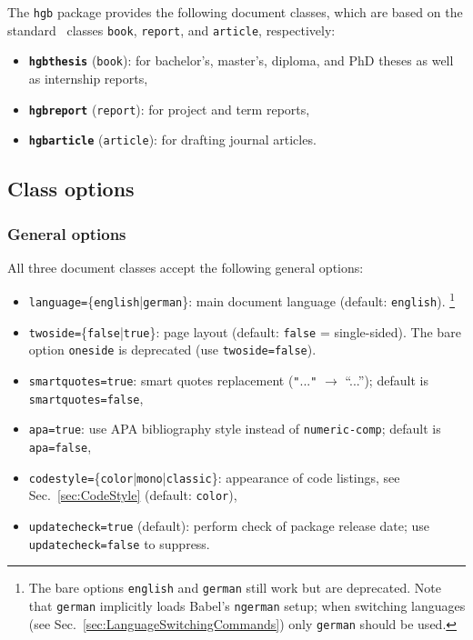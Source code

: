 \documentclass[language=english]{hgbarticle}
\begin{document}
The \texttt{hgb} package provides the following document classes, which are
based on the standard \latex\ classes \texttt{book}, \texttt{report}, and
\texttt{article}, respectively:
%
\begin{itemize}
    \item \textbf{\texttt{hgbthesis}} (\texttt{book}):
    for bachelor's, master's, diploma, and PhD theses as well as internship reports,
    \item \textbf{\texttt{hgbreport}} (\texttt{report}):
    for project and term reports,
    \item \textbf{\texttt{hgbarticle}} (\texttt{article}):
    for drafting journal articles.
\end{itemize}


\subsection{Class options}

\subsubsection{General options}

All three document classes accept the following general options:
%
\begin{itemize}
	\item \texttt{language=}\{\texttt{english}|\texttt{german}\}:
		main document language (default: \texttt{english}).%
		\footnote{The bare options \texttt{english} and \texttt{german} still work but are deprecated.
		Note that \texttt{german} implicitly loads Babel's \texttt{ngerman} setup; when switching languages
		(see Sec.~\ref{sec:LanguageSwitchingCommands}) only \texttt{german} should be used.}
	\item \texttt{twoside=}\{\texttt{false}|\texttt{true}\}:
		page layout (default: \texttt{false} = single-sided).
		The bare option \texttt{oneside} is deprecated (use \texttt{twoside=false}).
	\item \texttt{smartquotes=true}:
		smart quotes replacement (\verb!"!...\verb!"! $\rightarrow$ ``...'');
		default is \texttt{smartquotes=false},
	\item \texttt{apa=true}:
		use APA bibliography style instead of \texttt{numeric-comp};
		default is \texttt{apa=false},
	\item \texttt{codestyle=}\{\texttt{color}|\texttt{mono}|\texttt{classic}\}:
		appearance of code listings, see Sec.~\ref{sec:CodeStyle} (default: \texttt{color}),
	\item \texttt{updatecheck=true} (default): perform check of package release date;
		use \texttt{updatecheck=false} to suppress.
\end{itemize}
\end{document}
